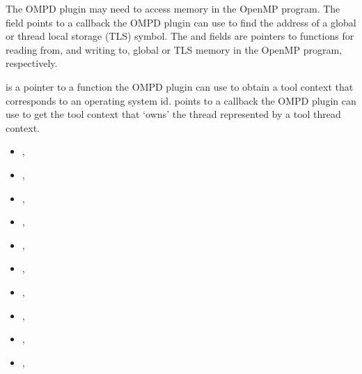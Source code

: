 The OMPD plugin may need to access memory in the OpenMP program.
The  field points to a callback the
OMPD plugin can use to find the address of a global or thread
local storage (TLS) symbol.
The  and  fields are
pointers to functions for reading from, and writing to, global or TLS
memory in the OpenMP program, respectively.

 is a pointer to a function
the OMPD plugin can use to obtain a tool context that corresponds to
an operating system id.
 points to a callback
the OMPD plugin can use to get the tool context that `owns' the
thread represented by a tool thread context.

\crossreferences
\begin{itemize}
\item
  , 
\item
  , 
\item
  , 
\item
  , 
\item
  , 
\item
  , 
\item
  , 
\item
  , 
\item
  , 
\item
  , 
\end{itemize}

